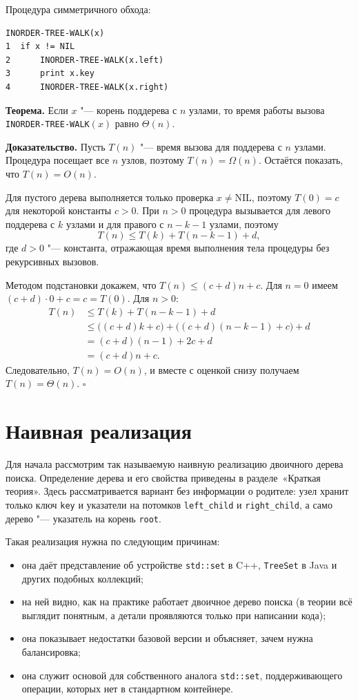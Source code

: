 \documentclass[otchet]{SCWorks}
\begin{document}
Процедура симметричного обхода:
 
\begin{Verbatim}[fontsize=\small]
INORDER-TREE-WALK(x)
1  if x != NIL
2      INORDER-TREE-WALK(x.left)
3      print x.key
4      INORDER-TREE-WALK(x.right)
\end{Verbatim}
 
\textbf{Теорема.} Если $x$ "--- корень поддерева с $n$ узлами, то время
работы вызова \texttt{INORDER-TREE-WALK}$(x)$ равно $\Theta(n)$.
 
\textbf{Доказательство.} Пусть $T(n)$ "--- время вызова для поддерева с $n$
узлами. Процедура посещает все $n$ узлов, поэтому $T(n) = \Omega(n)$.
Остаётся показать, что $T(n) = O(n)$.
 
Для пустого дерева выполняется только проверка $x \neq \mathrm{NIL}$,
поэтому $T(0) = c$ для некоторой константы $c > 0$. При $n > 0$ процедура
вызывается для левого поддерева с $k$ узлами и для правого с $n-k-1$
узлами, поэтому
\[
  T(n) \le T(k) + T(n-k-1) + d,
\]
где $d > 0$ "--- константа, отражающая время выполнения тела процедуры без
рекурсивных вызовов.
 
Методом подстановки докажем, что $T(n) \le (c+d)n + c$. Для $n = 0$ имеем
$(c+d)\cdot 0 + c = c = T(0)$. Для $n > 0$:
\begin{align*}
  T(n) &\le T(k) + T(n-k-1) + d \\
       &\le \bigl((c+d)k + c\bigr) + \bigl((c+d)(n-k-1) + c\bigr) + d \\
       &= (c+d)(n-1) + 2c + d \\
       &= (c+d)n + c.
\end{align*}
Следовательно, $T(n) = O(n)$, и вместе с оценкой снизу получаем
$T(n) = \Theta(n)$. \hfill $\square$


\section{Наивная реализация}

Для начала рассмотрим так называемую наивную реализацию двоичного дерева
поиска. Определение дерева и его свойства приведены в
разделе~«Краткая теория». Здесь рассматривается вариант без информации о
родителе: узел хранит только ключ \texttt{key} и указатели на потомков
\texttt{left\_child} и \texttt{right\_child}, а само дерево "--- указатель на
корень \texttt{root}.
 
Такая реализация нужна по следующим причинам:
\begin{itemize}
  \item она даёт представление об устройстве \texttt{std::set} в C++,
        \texttt{TreeSet} в Java и других подобных коллекций;
  \item на ней видно, как на практике работает двоичное дерево поиска
        (в теории всё выглядит понятным, а детали проявляются только при
        написании кода);
  \item она показывает недостатки базовой версии и объясняет, зачем нужна
        балансировка;
  \item она служит основой для собственного аналога \texttt{std::set},
        поддерживающего операции, которых нет в стандартном контейнере.
\end{itemize}
 
\end{document}
